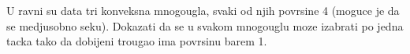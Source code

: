\problem
U ravni su data tri konveksna mnogougla, svaki od njih povrsine 4 (moguce je da se medjusobno seku).
Dokazati da se u svakom mnogouglu moze izabrati po jedna tacka tako da dobijeni trougao ima povrsinu barem 1.
\solution
\endproblem
